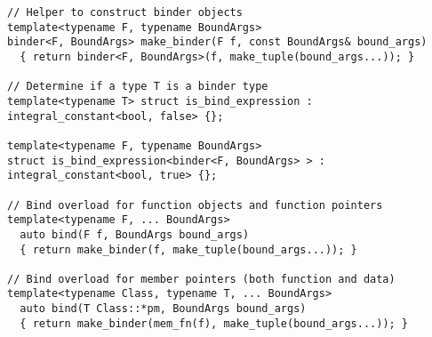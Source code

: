 \documentclass{article}
\begin{document}
\begin{verbatim}
// Helper to construct binder objects
template<typename F, typename BoundArgs>
binder<F, BoundArgs> make_binder(F f, const BoundArgs& bound_args)
  { return binder<F, BoundArgs>(f, make_tuple(bound_args...)); }

// Determine if a type T is a binder type
template<typename T> struct is_bind_expression : integral_constant<bool, false> {};

template<typename F, typename BoundArgs>
struct is_bind_expression<binder<F, BoundArgs> > : integral_constant<bool, true> {};

// Bind overload for function objects and function pointers
template<typename F, ... BoundArgs>
  auto bind(F f, BoundArgs bound_args)
  { return make_binder(f, make_tuple(bound_args...)); }

// Bind overload for member pointers (both function and data)
template<typename Class, typename T, ... BoundArgs>
  auto bind(T Class::*pm, BoundArgs bound_args)
  { return make_binder(mem_fn(f), make_tuple(bound_args...)); }
\end{verbatim}
\normalsize



\end{document}
